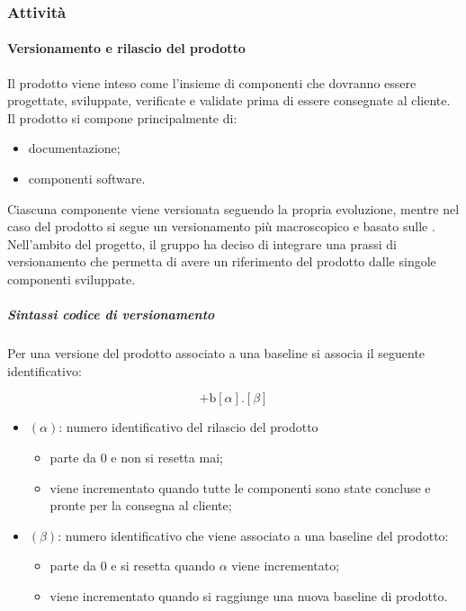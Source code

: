 \subsubsection{Attività}

	\paragraph{Versionamento e rilascio del prodotto}

	Il prodotto viene inteso come l'insieme di componenti che dovranno essere progettate, sviluppate, verificate e validate prima di essere consegnate al cliente. Il prodotto si compone principalmente di:
	\begin{itemize}
		\item documentazione;
		\item componenti software.
	\end{itemize}

	Ciascuna componente viene versionata seguendo la propria evoluzione, mentre nel caso del prodotto si segue un versionamento più macroscopico e basato sulle .
	Nell'ambito del progetto, il gruppo ha deciso di integrare una prassi di versionamento che permetta di avere un riferimento del prodotto dalle singole componenti sviluppate.

		\subparagraph{Sintassi codice di versionamento}

		Per una versione del prodotto associato a una baseline si associa il seguente identificativo:

		\[%
			\text{+b}[\alpha].[\beta]
		\]

		\begin{itemize}
			\item \((\alpha)\): numero identificativo del rilascio del prodotto
			\begin{itemize}
				\item parte da 0 e non si resetta mai;
				\item viene incrementato quando tutte le componenti sono state concluse e pronte per la consegna al cliente;
			\end{itemize}
			\item \((\beta)\): numero identificativo che viene associato a una baseline del prodotto:
			\begin{itemize}
	  			\item parte da 0 e si resetta quando \(\alpha\) viene incrementato;
				\item viene incrementato quando si raggiunge una nuova baseline di prodotto. 
			\end{itemize}
		\end{itemize}

